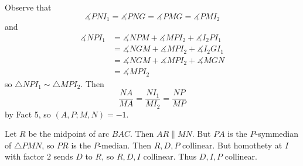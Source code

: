 Observe that \[\measuredangle{PNI_1}=\measuredangle{PNG}=\measuredangle{PMG}=\measuredangle{PMI_2}\] and
\begin{align*}
	\measuredangle{NPI_1}&=\measuredangle{NPM}+\measuredangle{MPI_2}+\measuredangle{I_2PI_1}\\
	&=\measuredangle{NGM}+\measuredangle{MPI_2}+\measuredangle{I_2GI_1}\\
	&=\measuredangle{NGM}+\measuredangle{MPI_2}+\measuredangle{MGN}\\
	&=\measuredangle{MPI_2}
\end{align*}
so $\triangle{NPI_1}\sim\triangle{MPI_2}$. Then \[\frac{NA}{MA}=\frac{NI_1}{MI_2}=\frac{NP}{MP}\] by Fact 5, so $(A,P;M,N)=-1$.

Let $R$ be the midpoint of arc $BAC$. Then $AR\parallel MN$. But $PA$ is the $P$-symmedian of $\triangle{PMN}$, so $PR$ is the $P$-median. Then $R,D,P$ collinear. But homothety at $I$ with factor $2$ sends $D$ to $R$, so $R,D,I$ collinear. Thus $D,I,P$ collinear.